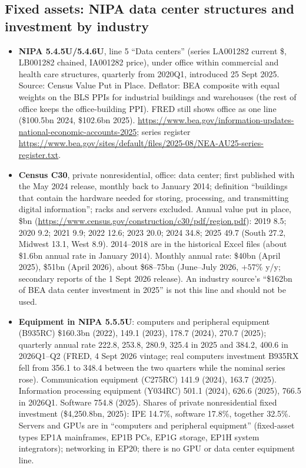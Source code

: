 \documentclass[11pt]{article}
\begin{document}
\subsection{Fixed assets: NIPA data center structures and investment by industry}\label{sec:fa}
\begin{itemize}
  \item \textbf{NIPA 5.4.5U/5.4.6U}, line 5 ``Data centers'' (series LA001282 current \$, LB001282 chained, IA001282 price), under office within commercial and health care structures, quarterly from 2020Q1, introduced 25 Sept 2025. Source: Census Value Put in Place. Deflator: BEA composite with equal weights on the BLS PPIs for industrial buildings and warehouses (the rest of office keeps the office-building PPI). FRED still shows office as one line (\$100.5bn 2024, \$102.6bn 2025). \url{https://www.bea.gov/information-updates-national-economic-accounts-2025}; series register \url{https://www.bea.gov/sites/default/files/2025-08/NEA-AU25-series-register.txt}.
  \item \textbf{Census C30}, private nonresidential, office: data center; first published with the May 2024 release, monthly back to January 2014; definition ``buildings that contain the hardware needed for storing, processing, and transmitting digital information''; racks and servers excluded. Annual value put in place, \$bn (\url{https://www.census.gov/construction/c30/pdf/region.pdf}): 2019 8.5; 2020 9.2; 2021 9.9; 2022 12.6; 2023 20.0; 2024 34.8; 2025 49.7 (South 27.2, Midwest 13.1, West 8.9). 2014--2018 are in the historical Excel files (about \$1.6bn annual rate in January 2014). Monthly annual rate: \$40bn (April 2025), \$51bn (April 2026), about \$68--75bn (June--July 2026, $+57\%$ y/y; secondary reports of the 1 Sept 2026 release). An industry source's ``\$162bn of BEA data center investment in 2025'' is not this line and should not be used.
  \item \textbf{Equipment in NIPA 5.5.5U}: computers and peripheral equipment (B935RC) \$160.3bn (2022), 149.1 (2023), 178.7 (2024), 270.7 (2025); quarterly annual rate 222.8, 253.8, 280.9, 325.4 in 2025 and 384.2, 400.6 in 2026Q1--Q2 (FRED, 4 Sept 2026 vintage; real computers investment B935RX fell from 356.1 to 348.4 between the two quarters while the nominal series rose). Communication equipment (C275RC) 141.9 (2024), 163.7 (2025). Information processing equipment (Y034RC) 501.1 (2024), 626.6 (2025), 766.5 in 2026Q1. Software 754.8 (2025). Shares of private nonresidential fixed investment (\$4{,}250.8bn, 2025): IPE 14.7\%, software 17.8\%, together 32.5\%. Servers and GPUs are in ``computers and peripheral equipment'' (fixed-asset types EP1A mainframes, EP1B PCs, EP1G storage, EP1H system integrators); networking in EP20; there is no GPU or data center equipment line.

\end{itemize}
\end{document}
